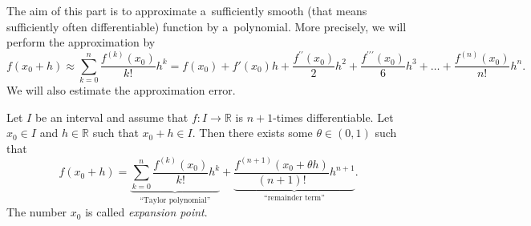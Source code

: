 

The aim of this part is to approximate a~sufficiently smooth (that means sufficiently often differentiable) function by a~polynomial. 
More precisely, we will perform the approximation by
\[f(x_0+h)\approx\sum_{k=0}^n\frac{f^{(k)}(x_0)}{k!}h^k=f(x_0)+f'(x_0)h+\frac{f^{\prime \prime}(x_0)}2h^2+\frac{f^{\prime\prime\prime}(x_0)}6h^3+\ldots+\frac{f^{(n)}(x_0)}{n!}h^n.\]
We will also estimate the approximation error.

\begin{Theorem}
    Let $I$ be an interval and assume that $f:I\to\mathbb{R}$ is $n+1$-times differentiable. Let $x_0\in I$ and $h\in\mathbb{R}$ such that $x_0+h\in I$. 
Then there exists some $\theta\in(0,1)$ such that
\[f(x_0+h)=\underbrace{\sum_{k=0}^n\frac{f^{(k)}(x_0)}{k!}h^k}_{\text{``Taylor polynomial''}}+\underbrace{\frac{f^{(n+1)}(x_0+\theta h)}{(n+1)!}h^{n+1}}_{\text{``remainder term''}}.\]
The number $x_0$ is called \emph{expansion point}.
\end{Theorem}

